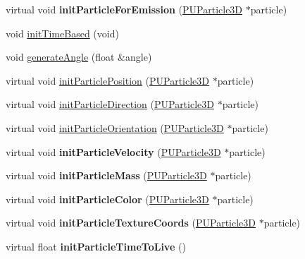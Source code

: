 \begin{DoxyCompactItemize}
virtual void {\bfseries init\+Particle\+For\+Emission} (\hyperlink{structPUParticle3D}{P\+U\+Particle3D} $\ast$particle)
\item 
void \hyperlink{classPUEmitter_a20336349505af1844784d9a075013bd4}{init\+Time\+Based} (void)
\item 
void \hyperlink{classPUEmitter_a5035190c6af34e7a8a6484b45720b28c}{generate\+Angle} (float \&angle)
\item 
virtual void \hyperlink{classPUEmitter_a65d85961411e319dbf5d19d455680f3d}{init\+Particle\+Position} (\hyperlink{structPUParticle3D}{P\+U\+Particle3D} $\ast$particle)
\item 
virtual void \hyperlink{classPUEmitter_ae9253c4848b3d942c4d9b223ed6907a2}{init\+Particle\+Direction} (\hyperlink{structPUParticle3D}{P\+U\+Particle3D} $\ast$particle)
\item 
virtual void \hyperlink{classPUEmitter_a33b103ed13f4d63b9d5381a18839e339}{init\+Particle\+Orientation} (\hyperlink{structPUParticle3D}{P\+U\+Particle3D} $\ast$particle)
\item 
\mbox{\label{classPUEmitter_aecb61fcd398541448340cef5577b5586}} 
virtual void {\bfseries init\+Particle\+Velocity} (\hyperlink{structPUParticle3D}{P\+U\+Particle3D} $\ast$particle)
\item 
\mbox{\label{classPUEmitter_a501b1ff36497f374c1b38ce59e900b46}} 
virtual void {\bfseries init\+Particle\+Mass} (\hyperlink{structPUParticle3D}{P\+U\+Particle3D} $\ast$particle)
\item 
\mbox{\label{classPUEmitter_aff75ce1071ca0f2ca6388b9652941986}} 
virtual void {\bfseries init\+Particle\+Color} (\hyperlink{structPUParticle3D}{P\+U\+Particle3D} $\ast$particle)
\item 
\mbox{\label{classPUEmitter_a33f32e80647e5afec9d9b208276fe056}} 
virtual void {\bfseries init\+Particle\+Texture\+Coords} (\hyperlink{structPUParticle3D}{P\+U\+Particle3D} $\ast$particle)
\item 
\mbox{\label{classPUEmitter_a890e25c6465d063feae1b7e0ca44932c}} 
virtual float {\bfseries init\+Particle\+Time\+To\+Live} ()
\item 
\mbox{\label{classPUEmitter_a5fe73914151a2ded7fa2eb381d7508de}} 

\end{DoxyCompactItemize}
